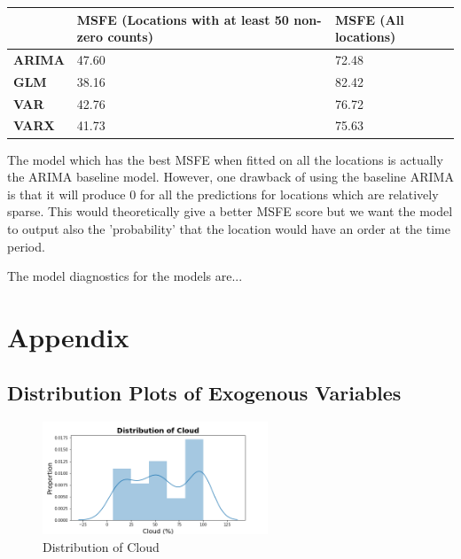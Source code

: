\documentclass[12pt, letterpaper] {article}
\begin{document}
\begin{table}[H]
\begin{tabular}{|l|l|l|}
\hline
                                     & \textbf{MSFE (Locations with at least 50 non-zero counts)} & \textbf{MSFE (All locations)} \\ \hline
\multicolumn{1}{|c|}{\textbf{ARIMA}} & 47.60                                                      & 72.48                        \\ \hline
\textbf{GLM}                         & 38.16                                                      & 82.42                         \\ \hline
\textbf{VAR}                         & 42.76                                                      & 76.72                         \\ \hline
\textbf{VARX}                        & 41.73                                                      & 75.63                        \\ \hline
\end{tabular}
\end{table}

\noindent The model which has the best MSFE when fitted on all the locations is actually the ARIMA baseline model. However, one drawback of using the baseline ARIMA is that it will produce 0 for all the predictions for locations which are relatively sparse. This would theoretically give a better MSFE score but we want the model to output also the 'probability' that the location would have an order at the time period. 

\noindent The model diagnostics for the models are... 

\section{Appendix}
\subsection{Distribution Plots of Exogenous Variables}
\begin{figure}[H]
    \centering
    \includegraphics[width=0.6\textwidth, height=0.3\textheight]{Images/distplot_cloud.png}
    \caption{Distribution of Cloud}
    \label{fig:Distribution of Cloud}
\end{figure}
\end{document}
